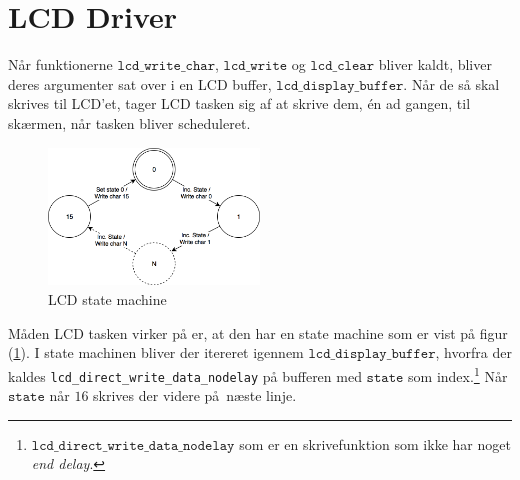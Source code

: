 \section{LCD Driver}
\label{sec:LCD_driver}
Når funktionerne $\mathtt{lcd\_write\_char}$, $\mathtt{lcd\_write}$ og $\mathtt{lcd\_clear}$ bliver kaldt, bliver deres argumenter sat over i en LCD buffer, $\mathtt{lcd\_display\_buffer}$.
Når de så skal skrives til LCD'et, tager LCD tasken sig af at skrive dem, én ad gangen, til skærmen, når tasken bliver scheduleret.
\begin{figure}[!ht]
	\centering
	\includegraphics[width=0.5\textwidth]{billeder/lcd_state_machine.png}
	\caption{LCD state machine}
	\label{fig:LCD_state_machine}
\end{figure}
\newline
Måden LCD tasken virker på er, at den har en state machine som er vist på figur (\ref{fig:LCD_state_machine}).\newline
I state machinen bliver der itereret igennem $\mathtt{lcd\_display\_buffer}$, hvorfra der kaldes \newline \texttt{lcd\_direct\_write\_data\_nodelay} på bufferen med $\mathtt{state}$ som index.\footnote{
$\mathtt{lcd\_direct\_write\_data\_nodelay}$ som er en skrivefunktion som ikke har noget \textit{end delay}.}
Når $\mathtt{state}$ når $16$ skrives der videre på næste linje.

